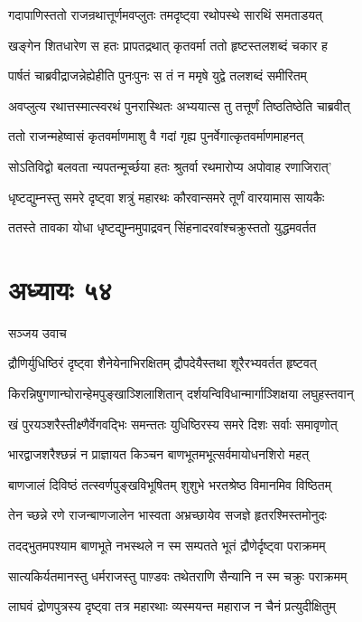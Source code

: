 \twolineshloka
{गदापाणिस्ततो राजन्रथात्तूर्णमवप्लुतः}
{तमदृष्ट्वा रथोपस्थे सारथिं समताडयत्}


\twolineshloka
{खङ्गेन शितधारेण स हतः प्रापतद्रथात्}
{कृतवर्मा ततो हृष्टस्तलशब्दं चकार ह}


\twolineshloka
{पार्षतं चाब्रवीद्राजन्नेह्येहीति पुनःपुनः}
{स तं न ममृषे युद्वे तलशब्दं समीरितम्}


\twolineshloka
{अवप्लुत्य रथात्तस्मात्स्वरथं पुनरास्थितः}
{अभ्ययात्स तु तत्तूर्णं तिष्ठतिष्ठेति चाब्रवीत्}


\twolineshloka
{ततो राजन्महेष्वासं कृतवर्माणमाशु वै}
{गदां गृह्य पुनर्वेगात्कृतवर्माणमाहनत्}


\twolineshloka
{सोऽतिविद्वो बलवता न्यपतन्मूर्च्छया हतः}
{श्रुतर्वा रथमारोप्य अपोवाह रणाजिरात्'}


\twolineshloka
{धृष्टद्युम्नस्तु समरे दृष्ट्वा शत्रुं महारथः}
{कौरवान्समरे तूर्णं वारयामास सायकैः}


\twolineshloka
{ततस्ते तावका योधा धृष्टद्युम्नमुपाद्रवन्}
{सिंहनादरवांश्चक्रुस्ततो युद्धमवर्तत}


\chapter{अध्यायः ५४}
\twolineshloka
{सञ्जय उवाच}
{}


\twolineshloka
{द्रौणिर्युधिष्ठिरं दृष्ट्वा शैनेयेनाभिरक्षितम्}
{द्रौपदेयैस्तथा शूरैरभ्यवर्तत हृष्टवत्}


\twolineshloka
{किरन्निषुगणान्घोरान्हेमपुङ्खाञ्शिलाशितान्}
{दर्शयन्विविधान्मार्गाञ्शिक्षया लघुहस्तवान्}


\twolineshloka
{खं पुरयञ्शरैस्तीक्ष्णैर्वेगवद्भिः समन्ततः}
{युधिष्ठिरस्य समरे दिशः सर्वाः समावृणोत्}


\twolineshloka
{भारद्वाजशरैश्छन्नं न प्राज्ञायत किञ्चन}
{बाणभूतमभूत्सर्वमायोधनशिरो महत्}


\twolineshloka
{बाणजालं दिविष्ठं तत्स्वर्णपुङ्खविभूषितम्}
{शुशुभे भरतश्रेष्ठ विमानमिव विष्ठितम्}


\twolineshloka
{तेन च्छन्ने रणे राजन्बाणजालेन भास्वता}
{अभ्रच्छायेव सजज्ञे हृतरश्मिस्तमोनुदः}


\twolineshloka
{तदद्भुतमपश्याम बाणभूते नभस्थले}
{न स्म सम्पतते भूतं द्रौणेर्दृष्ट्वा पराक्रमम्}


\twolineshloka
{सात्यकिर्यतमानस्तु धर्मराजस्तु पाण़्डवः}
{तथेतराणि सैन्यानि न स्म चक्रुः पराक्रमम्}


\twolineshloka
{लाघवं द्रोणपुत्रस्य दृष्ट्वा तत्र महारथाः}
{व्यस्मयन्त महाराज न चैनं प्रत्युदीक्षितुम्}


